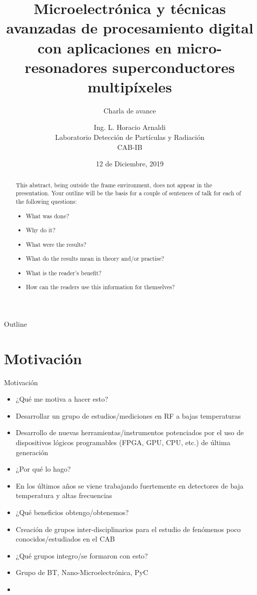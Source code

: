 \documentclass[ignorenonframetext,12pt]{beamer}
\title{Microelectrónica y técnicas avanzadas de procesamiento digital con
aplicaciones en micro-resonadores superconductores multipíxeles}
\subtitle{\alert{Charla de avance}}
\author{Ing. L. Horacio Arnaldi\\
Laboratorio Detecci\'on de Part\'iculas y Radiaci\'on\\
CAB-IB}
\date{12 de Diciembre, 2019}
\begin{document}
\begin{frame}
				\maketitle
\end{frame}

\begin{abstract}
				This abstract, being outside the frame environment, does not appear in
				the presentation.  Your outline will be the basis for a couple of
				sentences of talk for each of the following questions:
				\begin{itemize}
								\item What was done?
								\item Why do it?
								\item What were the results?
								\item What do the results mean in theory and/or practise?
								\item What is the reader's benefit?
								\item How can the readers use this information for themselves? 
				\end{itemize}
\end{abstract}

\begin{frame}{Outline}
				\tableofcontents
\end{frame}

\section{Motivación}
\begin{frame}{Motivación}
				\begin{itemize}
								\item ¿Qué me motiva a hacer esto?
								\item Desarrollar un grupo de estudios/mediciones en RF a bajas
												temperaturas
								\item Desarrollo de nuevas herramientas/instrumentos potenciados
												por el uso de dispositivos lógicos programables (FPGA,
												GPU, CPU, etc.) de última generación
								\item ¿Por qué lo hago?
								\item En los últimos años se viene trabajando fuertemente en
												detectores de baja temperatura y altas frecuencias
								\item ¿Qué beneficios obtengo/obtenemos?
								\item Creación de grupos inter-disciplinarios para el estudio de
												fenómenos poco conocidos/estudiados en el CAB
								\item ¿Qué grupos integro/se formaron con esto?
								\item Grupo de BT, Nano-Microelectrónica, PyC
								\item 
				\end{itemize}

\end{frame}
\end{document}
